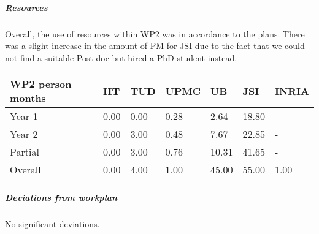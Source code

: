 \subparagraph{Resources}
Overall, the use of resources within WP2 was in accordance to the plans. There was a slight increase in the amount of PM for JSI due to the fact that we could not find a suitable Post-doc but hired a PhD student instead.

\begin{center}
\begin{tabular}{|C{1.5cm}|C{1.5cm}|C{1.5cm}|C{2cm}|C{2cm}|C{2cm}|C{2cm}|}
\hline
\footnotesize \textbf{WP2 person months}& \footnotesize \textbf{IIT}&\footnotesize \textbf{TUD}&\footnotesize \textbf{UPMC}& \footnotesize \textbf{UB} &\footnotesize \textbf{JSI} & \footnotesize \textbf{INRIA} \\ \hline
\footnotesize Year 1 &  0.00     & 0.00 & 0.28 & 2.64 & 18.80  &-  \\  \hline
\footnotesize Year 2 &  0.00     & 3.00 & 0.48 & 7.67 & 22.85  &-  \\  \hline
\footnotesize Partial &  0.00     & 3.00 & 0.76 & 10.31 & 41.65 & - \\ \hline \hline
\footnotesize Overall & 0.00     & 4.00 & 1.00 & 45.00 & 55.00 & 1.00 \\ \hline
\end{tabular}
\end{center}

\subparagraph{Deviations from workplan} 
No significant deviations.